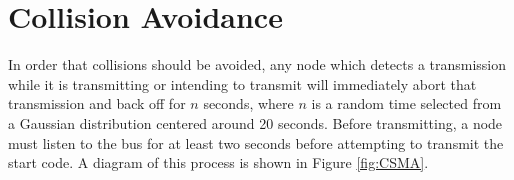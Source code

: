 \section{Collision Avoidance}
\label{sec:collision_avoidance}

In order that collisions should be avoided, any node which detects a transmission while it is transmitting or intending to transmit will immediately abort that transmission and back off for $n$ seconds, where $n$ is a random time selected from a Gaussian distribution centered around 20 seconds. Before transmitting, a node must listen to the bus for at least two seconds before attempting to transmit the start code. A diagram of this process is shown in Figure \ref{fig:CSMA}.


